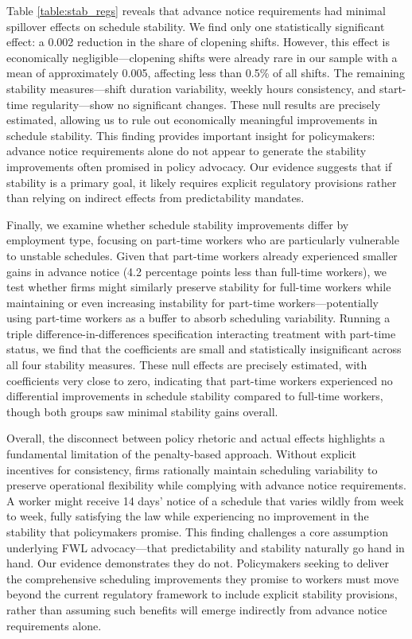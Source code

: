 \documentclass[letterpaper,11pt,leqno]{article}
\theoremstyle{paper}
\begin{document}
Table \ref{table:stab_regs} reveals that advance notice requirements had minimal spillover effects on schedule stability. We find only one statistically significant effect: a 0.002 reduction in the share of clopening shifts. However, this effect is economically negligible—clopening shifts were already rare in our sample with a mean of approximately 0.005, affecting less than 0.5\% of all shifts. The remaining stability measures—shift duration variability, weekly hours consistency, and start-time regularity—show no significant changes. These null results are precisely estimated, allowing us to rule out economically meaningful improvements in schedule stability. This finding provides important insight for policymakers: advance notice requirements alone do not appear to generate the stability improvements often promised in policy advocacy. Our evidence suggests that if stability is a primary goal, it likely requires explicit regulatory provisions rather than relying on indirect effects from predictability mandates.

Finally, we examine whether schedule stability improvements differ by employment type, focusing on part-time workers who are particularly vulnerable to unstable schedules. Given that part-time workers already experienced smaller gains in advance notice (4.2 percentage points less than full-time workers), we test whether firms might similarly preserve stability for full-time workers while maintaining or even increasing instability for part-time workers—potentially using part-time workers as a buffer to absorb scheduling variability. Running a triple difference-in-differences specification interacting treatment with part-time status, we find that the coefficients are small and statistically insignificant across all four stability measures. These null effects are precisely estimated, with coefficients very close to zero, indicating that part-time workers experienced no differential improvements in schedule stability compared to full-time workers, though both groups saw minimal stability gains overall.


Overall, the disconnect between policy rhetoric and actual effects highlights a fundamental limitation of the penalty-based approach. Without explicit incentives for consistency, firms rationally maintain scheduling variability to preserve operational flexibility while complying with advance notice requirements. A worker might receive 14 days' notice of a schedule that varies wildly from week to week, fully satisfying the law while experiencing no improvement in the stability that policymakers promise. This finding challenges a core assumption underlying FWL advocacy—that predictability and stability naturally go hand in hand. Our evidence demonstrates they do not. Policymakers seeking to deliver the comprehensive scheduling improvements they promise to workers must move beyond the current regulatory framework to include explicit stability provisions, rather than assuming such benefits will emerge indirectly from advance notice requirements alone.
\end{document}
